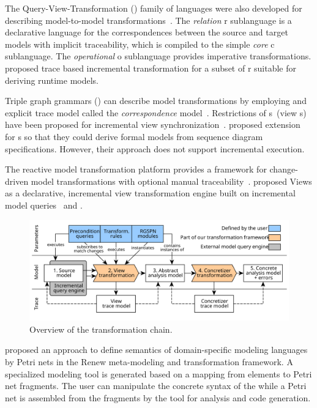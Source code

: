 The Query-View-Transformation () family of languages were also developed for describing model-to-model transformations~\citep{OMG16qvt}. The \emph{relation} r sublanguage is a declarative language for the correspondences between the source and target models with implicit traceability, which is compiled to the simple \emph{core} c sublanguage. The \emph{operational} o sublanguage provides imperative transformations. \citet{Song11incremental} proposed trace based incremental transformation for a subset of r suitable for deriving runtime models.

Triple graph grammars () can describe model transformations by employing and explicit trace model called the \emph{correspondence} model~\citep{Schurr94tgg}. Restrictions of s~(view s) have been proposed for incremental view synchronization~\citep{Jakob06nonmaterialized,Anjorin14materialized}. \citet{Greenyer11advanced} proposed extension for s so that they could derive formal models from sequence diagram specifications. However, their approach does not support incremental execution.

The  reactive model transformation platform provides a framework for change-driven model transformations with optional manual traceability~\citep{Bergmann15viatra}. \citet{Debreceni14viewmodel} proposed  Views as a declarative, incremental view transformation engine built on incremental model queries~\citep{Ujhelyi15incquery} and .

\begin{figure}
  \centering
  \includegraphics[scale=0.9]{figures/transformation_chain}
  \caption{Overview of the transformation chain.}
  \label{fig:transform:overview}
\end{figure}

\citet{Mosteller16semantics} proposed an approach to define semantics of domain-specific modeling languages by Petri nets in the Renew meta-modeling and transformation framework. A specialized modeling tool is generated based on a mapping from  elements to Petri net fragments. The user can manipulate the concrete syntax of the  while a Petri net is assembled from the fragments by the tool for analysis and code generation.

